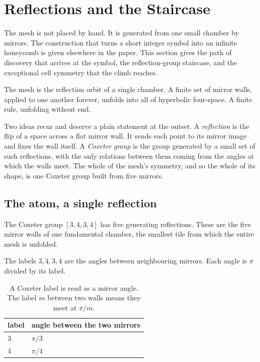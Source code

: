 \section{Reflections and the Staircase}

The mesh is not placed by hand. It is generated from one small chamber by mirrors. The construction that turns a short integer symbol into an infinite honeycomb is given elsewhere in the paper. This section gives the path of discovery that arrives at the symbol, the reflection-group staircase, and the exceptional cell symmetry that the climb reaches.

\begin{principle}
The mesh is the reflection orbit of a single chamber. A finite set of mirror walls, applied to one another forever, unfolds into all of hyperbolic four-space. A finite rule, unfolding without end.
\end{principle}

Two ideas recur and deserve a plain statement at the outset. A \emph{reflection} is the flip of a space across a flat mirror wall. It sends each point to its mirror image and fixes the wall itself. A \emph{Coxeter group} is the group generated by a small set of such reflections, with the only relations between them coming from the angles at which the walls meet. The whole of the mesh's symmetry, and so the whole of its shape, is one Coxeter group built from five mirrors.

\subsection{The atom, a single reflection}

The Coxeter group $[3,4,3,4]$ has five generating reflections. These are the five mirror walls of one fundamental chamber, the smallest tile from which the entire mesh is unfolded.

The labels $3, 4, 3, 4$ are the angles between neighbouring mirrors. Each angle is $\pi$ divided by its label.

\begin{table}[ht]
\centering
\begin{tabular}{@{}ll@{}}
\toprule
label & angle between the two mirrors \\
\midrule
$3$ & $\pi / 3$ \\
$4$ & $\pi / 4$ \\
\bottomrule
\end{tabular}
\caption{A Coxeter label is read as a mirror angle. The label $m$ between two walls means they meet at $\pi/m$.}
\label{tab:mirror-angles}
\end{table}


